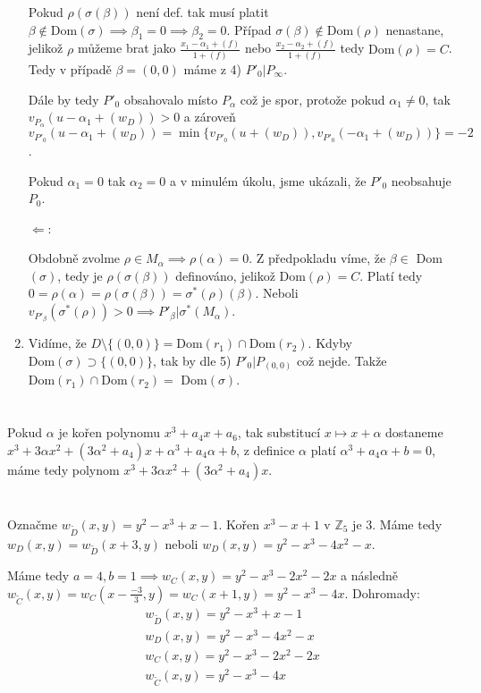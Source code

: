 \documentclass[12pt, a4paper]{article}
\begin{document}
\begin{enumerate}
    Pokud $\rho(\sigma(\beta))$ není def. tak musí platit $\beta \notin \text{Dom}(\sigma) \implies \beta_1 = 0 \implies \beta_2 = 0$. Případ $\sigma(\beta) \notin \text{Dom}(\rho)$ nenastane, jelikož $\rho$ můžeme brat jako $\frac{x_1-\alpha_1+(f)}{1+(f)}$ nebo $\frac{x_2-\alpha_2+(f)}{1+(f)}$ tedy $\text{Dom}(\rho)=C$. Tedy v případě $\beta=(0,0)$ máme z 4) $P'_0 | P_\infty$. 

    Dále by tedy $P'_0$ obsahovalo místo $P_\alpha$ což je spor, protože pokud $\alpha_1 \neq 0$, tak $v_{P_\alpha}(u-\alpha_1+(w_D))>0$ a zároveň $v_{P'_0}(u-\alpha_1+(w_D))=\min\{v_{P'_0}(u+(w_D)), v_{P'_0}(-\alpha_1+(w_D))\}=-2$. 

    Pokud $\alpha_1 = 0$ tak $\alpha_2 = 0$ a v minulém úkolu, jsme ukázali, že $P'_0$ neobsahuje $P_0$.

    $\Leftarrow$:

    Obdobně zvolme $\rho \in M_\alpha \implies \rho(\alpha) = 0$. Z předpokladu víme, že $\beta \in $ Dom$(\sigma)$, tedy je $\rho(\sigma(\beta))$ definováno, jelikož Dom$(\rho) = C$. Platí tedy $0 = \rho(\alpha) = \rho(\sigma(\beta)) = \sigma^*(\rho)(\beta)$. Neboli $v_{P'_\beta}(\sigma^*(\rho)) > 0 \implies P'_\beta | \sigma^*(M_\alpha)$.

    \item Vidíme, že $D \setminus \{(0,0)\} = \text{Dom}(r_1) \cap \text{Dom}(r_2)$. Kdyby $\text{Dom}(\sigma) \supset \{(0,0)\}$, tak by dle 5) $P'_0|P_{(0,0)}$ což nejde. Takže $\text{Dom}(r_1) \cap \text{Dom}(r_2)=$ Dom$(\sigma)$. 
\end{enumerate}

\section{}
Pokud $\alpha$ je kořen polynomu $x^3+a_4x+a_6$, tak substitucí $x \mapsto x+\alpha$ dostaneme $x^3+3\alpha x^2+(3\alpha^2+a_4)x+\alpha^3+a_4\alpha+b$, z definice $\alpha$ platí $\alpha^3+a_4\alpha+b = 0$, máme tedy polynom $x^3+3\alpha x^2+(3\alpha^2+a_4)x$.

\section{}
Označme $w_{\tilde{D}}(x,y)=y^2-x^3+x-1$. Kořen $x^3-x+1$ v $\mathbb{Z}_5$ je 3. Máme tedy $w_D(x,y)=w_{\tilde{D}}(x+3,y)$ neboli $w_D(x,y)=y^2-x^3-4x^2-x$.

Máme tedy $a=4, b=1 \implies w_C(x,y)=y^2-x^3-2x^2-2x$ a následně \\$w_{\tilde{C}}(x,y)=w_C(x-\frac{-3}{3},y)=w_C(x+1,y)=y^2-x^3-4x$. Dohromady:
\begin{gather*}
w_{\tilde{D}}(x,y)=y^2-x^3+x-1\\
w_D(x,y)=y^2-x^3-4x^2-x\\
w_C(x,y)=y^2-x^3-2x^2-2x\\
w_{\tilde{C}}(x,y)=y^2-x^3-4x
\end{gather*}
\end{document}
